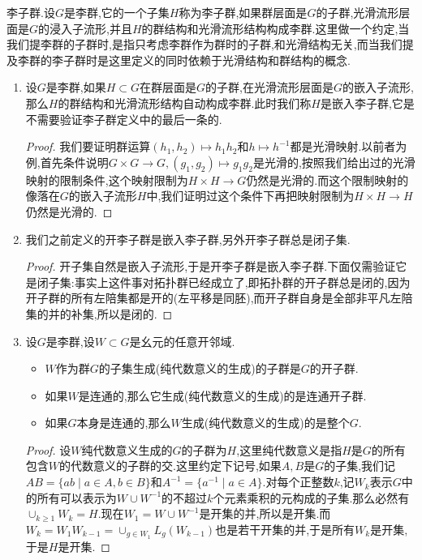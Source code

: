 李子群.设$G$是李群,它的一个子集$H$称为李子群,如果群层面是$G$的子群,光滑流形层面是$G$的浸入子流形,并且$H$的群结构和光滑流形结构构成李群.这里做一个约定,当我们提李群的子群时,是指只考虑李群作为群时的子群,和光滑结构无关,而当我们提及李群的李子群时是这里定义的同时依赖于光滑结构和群结构的概念.
\begin{enumerate}
	\item 设$G$是李群,如果$H\subset G$在群层面是$G$的子群,在光滑流形层面是$G$的嵌入子流形,那么$H$的群结构和光滑流形结构自动构成李群.此时我们称$H$是嵌入李子群,它是不需要验证李子群定义中的最后一条的.
	\begin{proof}
		
		我们要证明群运算$(h_1,h_2)\mapsto h_1h_2$和$h\mapsto h^{-1}$都是光滑映射.以前者为例,首先条件说明$G\times G\to G,(g_1,g_2)\mapsto g_1g_2$是光滑的,按照我们给出过的光滑映射的限制条件,这个映射限制为$H\times H\to G$仍然是光滑的.而这个限制映射的像落在$G$的嵌入子流形$H$中,我们证明过这个条件下再把映射限制为$H\times H\to H$仍然是光滑的.
	\end{proof}
    \item 我们之前定义的开李子群是嵌入李子群,另外开李子群总是闭子集.
    \begin{proof}
    	
    	开子集自然是嵌入子流形,于是开李子群是嵌入李子群.下面仅需验证它是闭子集:事实上这件事对拓扑群已经成立了,即拓扑群的开子群总是闭的,因为开子群的所有左陪集都是开的(左平移是同胚),而开子群自身是全部非平凡左陪集的并的补集,所以是闭的.
    \end{proof}
    \item 设$G$是李群,设$W\subset G$是幺元的任意开邻域.
    \begin{itemize}
    	\item $W$作为群$G$的子集生成(纯代数意义的生成)的子群是$G$的开子群.
    	\item 如果$W$是连通的,那么它生成(纯代数意义的生成)的是连通开子群.
    	\item 如果$G$本身是连通的,那么$W$生成(纯代数意义的生成)的是整个$G$.
    \end{itemize}
    \begin{proof}
    	
    	设$W$纯代数意义生成的$G$的子群为$H$,这里纯代数意义是指$H$是$G$的所有包含$W$的代数意义的子群的交.这里约定下记号,如果$A,B$是$G$的子集,我们记$AB=\{ab\mid a\in A,b\in B\}$和$A^{-1}=\{a^{-1}\mid a\in A\}$.对每个正整数$k$,记$W_k$表示$G$中的所有可以表示为$W\cup W^{-1}$的不超过$k$个元素乘积的元构成的子集.那么必然有$\cup_{k\ge1}W_k=H$.现在$W_1=W\cup W^{-1}$是开集的并,所以是开集.而$W_k=W_1W_{k-1}=\cup_{g\in W_1}L_g(W_{k-1})$也是若干开集的并,于是所有$W_k$是开集,于是$H$是开集.
    	

\end{proof}
\end{enumerate}
